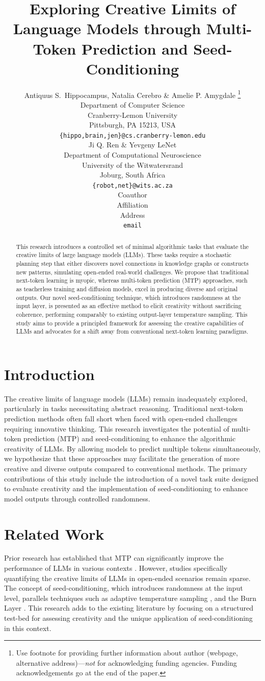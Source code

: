 \documentclass{article} %
\title{Exploring Creative Limits of Language Models through Multi-Token Prediction and Seed-Conditioning}
\author{Antiquus S.~Hippocampus, Natalia Cerebro \& Amelie P. Amygdale \thanks{ Use footnote for providing further information
about author (webpage, alternative address)---\emph{not} for acknowledging
funding agencies.  Funding acknowledgements go at the end of the paper.} \\
Department of Computer Science\\
Cranberry-Lemon University\\
Pittsburgh, PA 15213, USA \\
\texttt{\{hippo,brain,jen\}@cs.cranberry-lemon.edu} \\
\And
Ji Q. Ren \& Yevgeny LeNet \\
Department of Computational Neuroscience \\
University of the Witwatersrand \\
Joburg, South Africa \\
\texttt{\{robot,net\}@wits.ac.za} \\
\AND
Coauthor \\
Affiliation \\
Address \\
\texttt{email}
}
\begin{document}
\maketitle

\begin{abstract}
This research introduces a controlled set of minimal algorithmic tasks that evaluate the creative limits of large language models (LLMs). These tasks require a stochastic planning step that either discovers novel connections in knowledge graphs or constructs new patterns, simulating open-ended real-world challenges. We propose that traditional next-token learning is myopic, whereas multi-token prediction (MTP) approaches, such as teacherless training and diffusion models, excel in producing diverse and original outputs. Our novel seed-conditioning technique, which introduces randomness at the input layer, is presented as an effective method to elicit creativity without sacrificing coherence, performing comparably to existing output-layer temperature sampling. This study aims to provide a principled framework for assessing the creative capabilities of LLMs and advocates for a shift away from conventional next-token learning paradigms.
\end{abstract}

\section{Introduction}
\label{sec:intro}
The creative limits of language models (LLMs) remain inadequately explored, particularly in tasks necessitating abstract reasoning. Traditional next-token prediction methods often fall short when faced with open-ended challenges requiring innovative thinking. This research investigates the potential of multi-token prediction (MTP) and seed-conditioning to enhance the algorithmic creativity of LLMs. By allowing models to predict multiple tokens simultaneously, we hypothesize that these approaches may facilitate the generation of more creative and diverse outputs compared to conventional methods. The primary contributions of this study include the introduction of a novel task suite designed to evaluate creativity and the implementation of seed-conditioning to enhance model outputs through controlled randomness.

\section{Related Work}
\label{sec:related}
Prior research has established that MTP can significantly improve the performance of LLMs in various contexts \citep{kalinsky2023simpleae, walker2024futuretp}. However, studies specifically quantifying the creative limits of LLMs in open-ended scenarios remain sparse. The concept of seed-conditioning, which introduces randomness at the input level, parallels techniques such as adaptive temperature sampling \citep{zhu2023hotoc}, and the Burn Layer \citep{hassan2024optimizingpa}. This research adds to the existing literature by focusing on a structured test-bed for assessing creativity and the unique application of seed-conditioning in this context.
\end{document}

